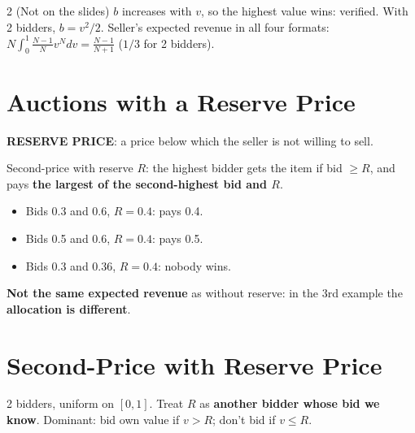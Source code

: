 \documentclass[a4paper,9pt]{extarticle}
\begin{document}
\begin{multicols}{2}
(Not on the slides) $b$ increases with $v$, so the highest value wins: verified. With 2
bidders, $b = v^2/2$. Seller's expected revenue in all four formats:
$N\int_0^1 \frac{N-1}{N}v^N dv = \frac{N-1}{N+1}$ ($1/3$ for 2 bidders).



\section{Auctions with a Reserve Price}


\begin{definition}

\textbf{RESERVE PRICE}: a price below which the seller is not willing to sell.

Second-price with reserve $R$: the highest bidder gets the item if bid $\ge R$, and pays
\textbf{the largest of the second-highest bid and $R$}.

\begin{itemize}

\item Bids 0.3 and 0.6, $R = 0.4$: pays 0.4.

\item Bids 0.5 and 0.6, $R = 0.4$: pays 0.5.

\item Bids 0.3 and 0.36, $R = 0.4$: nobody wins.

\end{itemize}

\end{definition}


\begin{warning}

\textbf{Not the same expected revenue} as without reserve: in the 3rd example the
\textbf{allocation is different}.

\end{warning}



\section{Second-Price with Reserve Price}


2 bidders, uniform on $[0,1]$. Treat $R$ as \textbf{another bidder whose bid we know}.
Dominant: bid own value if $v > R$; don't bid if $v \le R$.


\begin{center}


\end{center}
\end{multicols}
\end{document}
